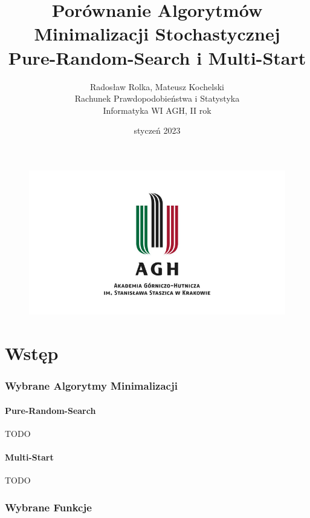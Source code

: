 \documentclass{lab}
\begin{document}
\captionsetup[lstlisting]{labelformat=myformat}

\begin{figure}
    \centering
    \includegraphics{img/agh.png}
\end{figure}
\title{\Huge \textbf{Porównanie Algorytmów Minimalizacji Stochastycznej}\\ Pure-Random-Search i Multi-Start}
\author{Radosław Rolka, Mateusz Kochelski\\Rachunek Prawdopodobieństwa i Statystyka\\Informatyka WI AGH, II rok}
\date{styczeń 2023}

\maketitle
\newpage
\tableofcontents
\thispagestyle{fancy} 
\newpage

\part{Wstęp}
\section{Wybrane Algorytmy Minimalizacji}
\subsection{Pure-Random-Search}
TODO

\subsection{Multi-Start}
TODO

\section{Wybrane Funkcje}
\end{document}
